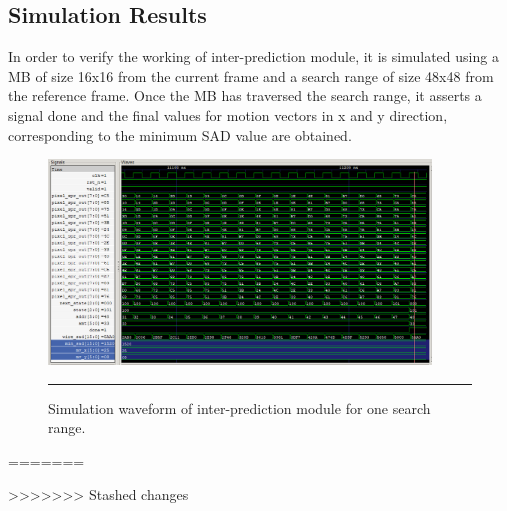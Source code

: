 \subsection{Simulation Results}
In order to verify the working of inter-prediction module, it is simulated using a MB of size 16x16 from the current frame and a search range of size 48x48 from the reference frame. Once the MB has traversed the search range, it asserts a signal done and the final values for motion vectors in x and y direction, corresponding to the minimum SAD value are obtained. 
\begin{figure}[H]
	\centering
	\includegraphics[width = 4in]{./Figures/wave2.png}
	\rule{35em}{0.5pt}
	\caption{Simulation waveform of inter-prediction module for one search range.}
	\label{fig:wave2}
\end{figure}
=======

>>>>>>> Stashed changes
